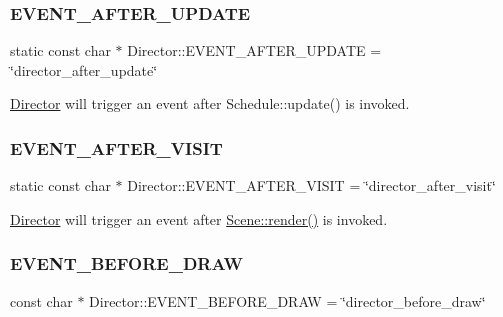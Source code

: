 \subsubsection{\texorpdfstring{E\+V\+E\+N\+T\+\_\+\+A\+F\+T\+E\+R\+\_\+\+U\+P\+D\+A\+TE}{EVENT\_AFTER\_UPDATE}}
{\footnotesize\ttfamily static const char $\ast$ Director\+::\+E\+V\+E\+N\+T\+\_\+\+A\+F\+T\+E\+R\+\_\+\+U\+P\+D\+A\+TE = \char`\"{}director\+\_\+after\+\_\+update\char`\"{}\hspace{0.3cm}{\ttfamily [static]}}

\hyperlink{classDirector}{Director} will trigger an event after Schedule\+::update() is invoked. \mbox{\label{classDirector_a666b12067c13df6d2ad1a2a687223344}} 
\subsubsection{\texorpdfstring{E\+V\+E\+N\+T\+\_\+\+A\+F\+T\+E\+R\+\_\+\+V\+I\+S\+IT}{EVENT\_AFTER\_VISIT}}
{\footnotesize\ttfamily static const char $\ast$ Director\+::\+E\+V\+E\+N\+T\+\_\+\+A\+F\+T\+E\+R\+\_\+\+V\+I\+S\+IT = \char`\"{}director\+\_\+after\+\_\+visit\char`\"{}\hspace{0.3cm}{\ttfamily [static]}}

\hyperlink{classDirector}{Director} will trigger an event after \hyperlink{classScene_a26d5468761d68ff0f3beb177bf8d2734}{Scene\+::render()} is invoked. \mbox{\label{classDirector_a7e0dab9d5caa7903d7f1d5761c2986a0}} 
\subsubsection{\texorpdfstring{E\+V\+E\+N\+T\+\_\+\+B\+E\+F\+O\+R\+E\+\_\+\+D\+R\+AW}{EVENT\_BEFORE\_DRAW}}
{\footnotesize\ttfamily const char $\ast$ Director\+::\+E\+V\+E\+N\+T\+\_\+\+B\+E\+F\+O\+R\+E\+\_\+\+D\+R\+AW = \char`\"{}director\+\_\+before\+\_\+draw\char`\"{}\hspace{0.3cm}{\ttfamily [static]}}

